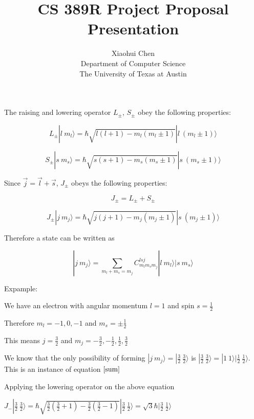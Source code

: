 \documentclass[landscape]{slides}
\author{Xiaohui Chen \\Department of Computer Science\\ The University of Texas at Austin }
\title{CS 389R Project Proposal Presentation}
\date{\vspace{-5ex}}
\begin{document}
\maketitle

The raising and lowering operator $L_{\pm}$, $S_{\pm}$ obey the following properties:

\begin{equation}
L_{\pm} |l\ m_l \rangle = \hbar \sqrt{l(l+1)-m_l(m_l \pm 1)} |l\ (m_l \pm 1) \rangle
\label{l}
\end{equation}


\begin{equation}
S_{\pm} |s\ m_s \rangle = \hbar \sqrt{s(s+1)-m_s(m_s \pm 1)} |s\ (m_s\pm 1) \rangle
\label{s}
\end{equation}

Since $\vec{j}= \vec{l}+ \vec{s}$, $J_{\pm}$ obeys the following properties:

\begin{equation}
J_{\pm}= L_{\pm} + S_{\pm}
\label{jsum}
\end{equation}

\begin{equation}
J_{\pm} |j\ m_j \rangle = \hbar \sqrt{j(j+1)-m_j(m_j \pm 1)} |s\ (m_j \pm 1) \rangle
\label{j}
\end{equation}

Therefore a state can be written as 

\begin{equation}
|j\ m_j \rangle= \sum\limits_{m_l+m_s=m_j} C_{m_l m_s m_j}^{l s j} |l\ m_l \rangle |s\ m_s \rangle \label{sum}
\end{equation}

Expample:

We have an electron with angular momentum $l=1$ and spin $s=\frac{1}{2}$

Therefore $m_l=-1,0,-1$ and $m_s= \pm \frac{1}{2}$

This means $j=\frac{3}{2}$ and $m_j= -\frac{3}{2}, - \frac{1}{2}, \frac{1}{2}, \frac{3}{2}$

We know that the only possibility of forming $|j\ m_j\rangle= |\frac{3}{2}\ \frac{3}{2}\rangle$ is $|\frac{3}{2}\ \frac{3}{2}\rangle = |1\ 1\rangle |\frac{1}{2}\ \frac{1}{2}\rangle $. This is an instance of equation $\ref{sum}$

Applying the lowering operator on the above equation

$J_{-}|\frac{3}{2}\ \frac{3}{2}\rangle =  \hbar \sqrt{\frac{3}{2} \left( \frac{3}{2}+1 \right) -  \frac{3}{2} \left( \frac{3}{2}-1 \right)} |\frac{3}{2}\ \frac{1}{2}\rangle = \sqrt{3} \hbar |\frac{3}{2}\ \frac{1}{2}\rangle$
\end{document}
